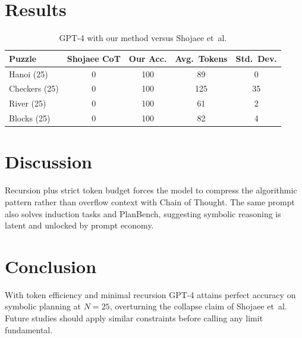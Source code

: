 \documentclass[11pt]{article}
\begin{document}
\section{Results}

\begin{table}[h]
\centering\footnotesize
\begin{tabular}{lcccc}
\toprule
Puzzle & Shojaee CoT & Our Acc. & Avg.\ Tokens & Std.\ Dev.\\
\midrule
Hanoi (25)   & 0 & 100 & 89  & 0 \\
Checkers (25)& 0 & 100 & 125 & 35 \\
River (25)   & 0 & 100 & 61  & 2 \\
Blocks (25)  & 0 & 100 & 82  & 4 \\
\bottomrule
\end{tabular}
\caption{GPT-4 with our method versus Shojaee et~al.}
\label{tab:results}
\end{table}

\section{Discussion}
Recursion plus strict token budget forces the model to compress the
algorithmic pattern rather than overflow context with Chain of Thought.
The same prompt also solves induction tasks and PlanBench, suggesting
symbolic reasoning is latent and unlocked by prompt economy.

\section{Conclusion}
With token efficiency and minimal recursion GPT-4 attains perfect
accuracy on symbolic planning at $N=25$, overturning the collapse claim
of Shojaee et~al. Future studies should apply similar constraints
before calling any limit fundamental.



\end{document}
